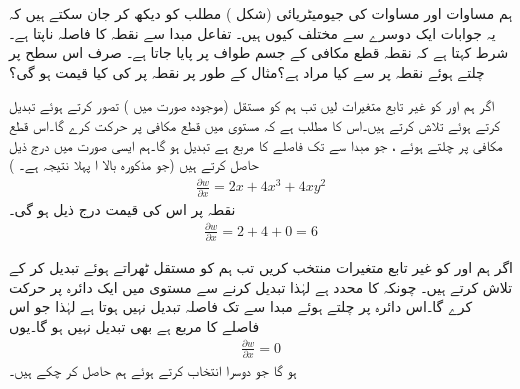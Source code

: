 ہم مساوات  اور مساوات  کی جیومیٹریائی (شکل )  مطلب کو دیکھ کر جان سکتے ہیں کہ یہ جوابات ایک دوسرے سے مختلف  کیوں ہیں۔ تفاعل  مبدا  سے نقطہ  کا فاصلہ ناپتا ہے۔ شرط  کہتا  ہے کہ نقطہ   قطع مکافی  کے جسم طواف پر پایا جاتا ہے۔ صرف اس سطح پر چلتے ہوئے نقطہ  پر   سے کیا مراد ہے؟مثال کے طور پر نقطہ  پر  کی کیا قیمت ہو گی؟

اگر ہم  اور  کو غیر تابع متغیرات لیں تب ہم   کو مستقل (موجودہ صورت میں )  تصور کرتے ہوئے  تبدیل کرتے ہوئے  تلاش کرتے ہیں۔اس کا مطلب ہے کہ  مستوی  میں قطع مکافی  پر حرکت کرے گا۔اس قطع مکافی پر چلتے ہوئے ،  جو مبدا سے  تک فاصلے کا مربع ہے تبدیل ہو گا۔ہم ایسی صورت میں  درج ذیل حاصل کرتے ہیں (جو مذکورہ بالا  ا پہلا نتیجہ ہے۔ )
\begin{align*}
\frac{\partial w}{\partial x}=2x+4x^3+4xy^2
\end{align*}
نقطہ  پر اس کی قیمت درج ذیل ہو گی۔
\begin{align*}
\frac{\partial w}{\partial x}=2+4+0=6
\end{align*}

اگر ہم  اور  کو غیر تابع متغیرات منتخب کریں تب ہم  کو مستقل ٹھراتے  ہوئے  تبدیل کر کے  تلاش کرتے ہیں۔ چونکہ  کا  محدد  ہے لہٰذا  تبدیل کرنے سے    مستوی  میں ایک دائرہ پر حرکت کرے گا۔اس دائرہ پر چلتے ہوئے مبدا سے  تک  فاصلہ تبدیل نہیں ہوتا ہے لہٰذا  جو اس فاصلے کا مربع ہے بھی تبدیل نہیں ہو گا۔یوں
\begin{align*}
\frac{\partial w}{\partial x}=0
\end{align*}
ہو گا جو دوسرا انتخاب  کرتے ہوئے ہم حاصل کر چکے ہیں۔

